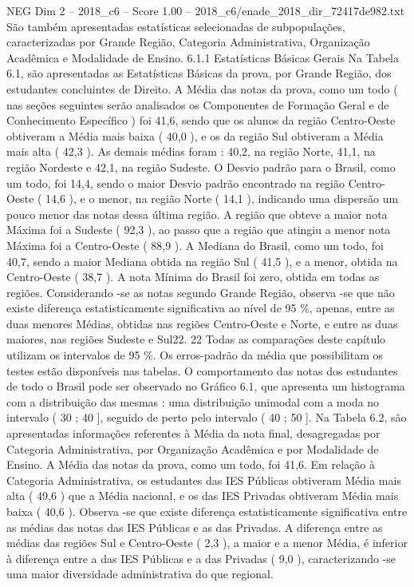 \begin{textsample}{NEG Dim 2 – 2018\_c6 – Score 1.00 – 2018\_c6/enade\_2018\_dir\_72417de982.txt}
São também apresentadas estatísticas selecionadas de subpopulações, caracterizadas por Grande Região, Categoria Administrativa, Organização Acadêmica e Modalidade de Ensino. 6.1.1 Estatísticas Básicas Gerais Na Tabela 6.1, são apresentadas as Estatísticas Básicas da prova, por Grande Região, dos estudantes concluintes de Direito.
A Média das notas da prova, como um todo ( nas seções seguintes serão analisados os Componentes de Formação Geral e de Conhecimento Específico ) foi 41,6, sendo que os alunos da região Centro-Oeste obtiveram a Média mais baixa ( 40,0 ), e os da região Sul obtiveram a Média mais alta ( 42,3 ).
As demais médias foram : 40,2, na região Norte, 41,1, na região Nordeste e 42,1, na região Sudeste.
O Desvio padrão para o Brasil, como um todo, foi 14,4, sendo o maior Desvio padrão encontrado na região Centro-Oeste ( 14,6 ), e o menor, na região Norte ( 14,1 ), indicando uma dispersão um pouco menor das notas dessa última região.
A região que obteve a maior nota Máxima foi a Sudeste ( 92,3 ), ao passo que a região que atingiu a menor nota Máxima foi a Centro-Oeste ( 88,9 ).
A Mediana do Brasil, como um todo, foi 40,7, sendo a maior Mediana obtida na região Sul ( 41,5 ), e a menor, obtida na Centro-Oeste ( 38,7 ).
A nota Mínima do Brasil foi zero, obtida em todas as regiões.
Considerando -se as notas segundo Grande Região, observa -se que não existe diferença estatisticamente significativa ao nível de 95 \%, apenas, entre as duas menores Médias, obtidas nas regiões Centro-Oeste e Norte, e entre as duas maiores, nas regiões Sudeste e Sul22. 22 Todas as comparações deste capítulo utilizam os intervalos de 95 \%.
Os erros-padrão da média que possibilitam os testes estão disponíveis nas tabelas.
O comportamento das notas dos estudantes de todo o Brasil pode ser observado no Gráfico 6.1, que apresenta um histograma com a distribuição das mesmas : uma distribuição unimodal com a moda no intervalo ( 30 ; 40 ], seguido de perto pelo intervalo ( 40 ; 50 ].
Na Tabela 6.2, são apresentadas informações referentes à Média da nota final, desagregadas por Categoria Administrativa, por Organização Acadêmica e por Modalidade de Ensino.
A Média das notas da prova, como um todo, foi 41,6.
Em relação à Categoria Administrativa, os estudantes das IES Públicas obtiveram Média mais alta ( 49,6 ) que a Média nacional, e os das IES Privadas obtiveram Média mais baixa ( 40,6 ).
Observa -se que existe diferença estatisticamente significativa entre as médias das notas das IES Públicas e as das Privadas.
A diferença entre as médias das regiões Sul e Centro-Oeste ( 2,3 ), a maior e a menor Média, é inferior à diferença entre a das IES Públicas e a das Privadas ( 9,0 ), caracterizando -se uma maior diversidade administrativa do que regional.

\end{textsample}
